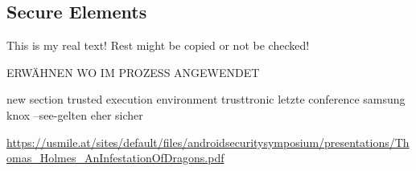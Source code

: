 \subsection{Secure Elements}\label{subsection:external-secure}
This is my real text! Rest might be copied or not be checked!


ERWÄHNEN WO IM PROZESS ANGEWENDET\newline

new section trusted execution environment
trusttronic letzte conference
samsung knox
--see-gelten eher sicher

\url{https://usmile.at/sites/default/files/androidsecuritysymposium/presentations/Thomas_Holmes_AnInfestationOfDragons.pdf}
